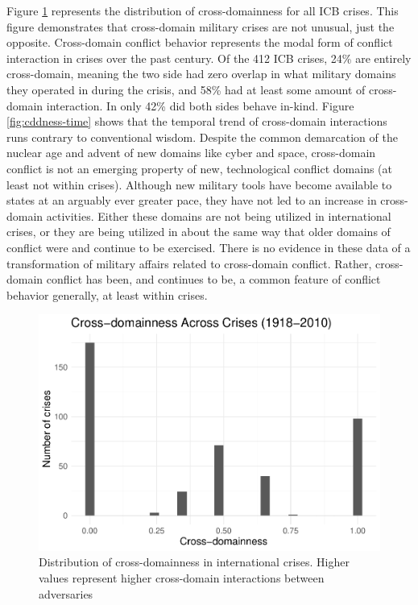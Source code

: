 \documentclass[
]{article}
\begin{document}
Figure \ref{fig:cddness} represents the distribution of cross-domainness for all ICB crises. This figure demonstrates that cross-domain military crises are not unusual, just the opposite. Cross-domain conflict behavior represents the modal form of conflict interaction in crises over the past century. Of the 412 ICB crises, 24\% are entirely cross-domain, meaning the two side had zero overlap in what military domains they operated in during the crisis, and 58\% had at least some amount of cross-domain interaction. In only 42\% did both sides behave in-kind. Figure \ref{fig:cddness-time} shows that the temporal trend of cross-domain interactions runs contrary to conventional wisdom. Despite the common demarcation of the nuclear age and advent of new domains like cyber and space, cross-domain conflict is not an emerging property of new, technological conflict domains (at least not within crises). Although new military tools have become available to states at an arguably ever greater pace, they have not led to an increase in cross-domain activities. Either these domains are not being utilized in international crises, or they are being utilized in about the same way that older domains of conflict were and continue to be exercised. There is no evidence in these data of a transformation of military affairs related to cross-domain conflict. Rather, cross-domain conflict has been, and continues to be, a common feature of conflict behavior generally, at least within crises.

\begin{figure}[h!]

{\centering \includegraphics[width=0.8\linewidth,]{2021-03-26_ICB-Domains_files/figure-latex/cddness-1} 

}

\caption{Distribution of cross-domainness in international crises. Higher values represent higher cross-domain interactions between adversaries}\label{fig:cddness}
\end{figure}
\end{document}
